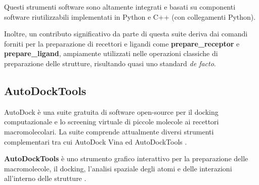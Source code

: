 Questi strumenti software sono altamente integrati e basati su componenti software riutilizzabili implementati in Python e C++ (con collegamenti Python).

Inoltre, un contributo significativo da parte di questa suite deriva dai comandi forniti per la preparazione di recettori e ligandi come \textbf{prepare\_receptor} e \textbf{prepare\_ligand}, ampiamente utilizzati nelle operazioni classiche di preparazione delle strutture, risultando quasi uno standard \textit{de facto}.

\subsection{AutoDockTools} \label{autodocktools}
AutoDock è una suite gratuita di software open-source  per il docking computazionale e lo screening virtuale di piccole molecole ai recettori macromolecolari. La suite comprende attualmente diversi strumenti complementari tra cui AutoDock Vina ed AutoDockTools \cite{forli_computational_2016}.

\textbf{AutoDockTools} è uno strumento grafico interattivo per la preparazione delle macromolecole, il docking, l'analisi spaziale degli atomi e delle interazioni all'interno delle strutture \cite{forli_computational_2016}.


